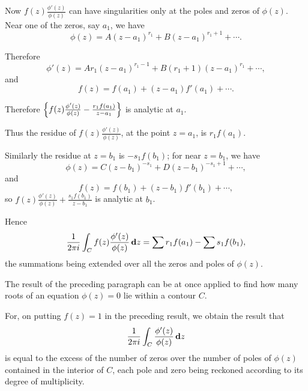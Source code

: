 Now
$f(z) \frac{\phi'(z)}{\phi(z)}$
can have singularities only at the poles and zeros of $\phi(z)$.
Near one of the zeros, say $a_{1}$, we have
$$
\phi(z)
=
A (z-a_{1})^{r_{1}}
+ B (z-a_{1})^{r_{1}+1}
+ \cdots.
$$

Therefore
$$
\phi'(z)
=
A r_{1} (z-a_{1})^{r_{1}-1}
+ B (r_{1}+1) (z-a_{1})^{r_{1}}
+ \cdots,
$$
and
$$
f(z) = f(a_{1}) + (z-a_{1}) f'(a_{1}) + \cdots.
$$

Therefore
$
\left\{ f(z) \frac{\phi'(z)}{\phi(z)}
  -
  \frac{ r_{1} f(a_{1}) }{ z - a_{1} }
 \right\}
$ is analytic at $a_{1}$.

Thus the residue of $f(z) \frac{\phi'(z)}{\phi(z)}$, at the point
$z=a_{1}$, is $r_{1} f(a_{1})$.

Similarly the residue at $z=b_{1}$ is
$-s_{1} f(b_{1})$; for near $z=b_{1}$, we have
$$
\phi(z)
=
C (z-b_{1})^{-s_{1}}
+ D (z-b_{1})^{-s_{1} + 1}
+ \cdots,
$$
and
$$
f(z)
=
f(b_{1})
+ (z - b_{1}) f'(b_{1})
+ \cdots,
$$
so
$
f(z) \frac{ \phi'(z) }{\phi(z)}
+
\frac{ s_{1} f(b_{1}) }{ z-b_{1} }
$
is analytic at $b_{1}$.

Hence
$$
\frac{1}{2\pi i}
\int_{C} f(z) \frac{ \phi'(z) }{\phi(z)} \, \mathbf{d} z
=
\sum r_{1} f(a_{1})
-
\sum s_{1} f(b_{1}),
$$
the summations being extended over all the zeros and poles of
$\phi(z)$.

The result of the preceding paragraph can be at once applied to find
how many roots of an equation $\phi(z) = 0$ lie within a contour $C$.

For, on putting $f(z) = 1$ in the preceding result, we obtain the
result that
$$
\frac{1}{2\pi i} 
\int_{C} \frac{ \phi'(z) }{\phi(z)} \, \mathbf{d} z
$$
is equal to the excess of the number of zeros over the number of poles
of $\phi(z)$ contained in the interior of $C$, each pole and zero
being reckoned according to its degree of multiplicity.

